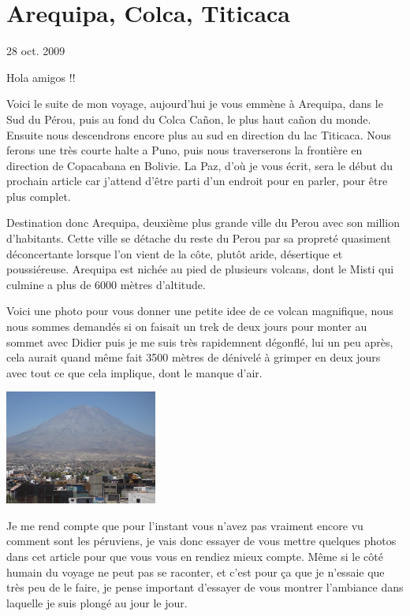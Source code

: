 \section{Arequipa, Colca, Titicaca}

28 oct. 2009

\begin{multicols}{2}

Hola amigos !!

Voici le suite de mon voyage, aujourd'hui je vous emmène à Arequipa, dans le Sud du Pérou, puis au fond du Colca Cañon, le plus haut cañon du monde. Ensuite nous descendrons encore plus au sud en direction du lac Titicaca. Nous ferons une très courte halte a Puno, puis nous traverserons la frontière en direction de Copacabana en Bolivie. La Paz, d'où je vous écrit, sera le début du prochain article car j'attend d'être parti d'un endroit pour en parler, pour être plus complet.

Destination donc Arequipa, deuxième plus grande ville du Perou avec son million d'habitants. Cette ville se détache du reste du Perou par sa propreté quasiment déconcertante lorsque l'on vient de la côte, plutôt aride, désertique et poussiéreuse. Arequipa est nichée au pied de plusieurs volcans, dont le Misti qui culmine a plus de 6000 mètres d'altitude.

Voici une photo pour vous donner une petite idee de ce volcan magnifique, nous nous sommes demandés si on faisait un trek de deux jours pour monter au sommet avec Didier puis je me suis très rapidemnent dégonflé, lui un peu après, cela aurait quand même fait 3500 mètres de dénivelé à grimper en deux jours avec tout ce que cela implique, dont le manque d'air.

\smallbreak
\hspace*{-0.65cm}
\includegraphics[width=5cm]{articles/Arequipa-colca-titicaca/1256606928TSDk.jpg}
\smallbreak

Je me rend compte que pour l'instant vous n'avez pas vraiment encore vu comment sont les péruviens, je vais donc essayer de vous mettre quelques photos dans cet article pour que vous vous en rendiez mieux compte. Même si le côté humain du voyage ne peut pas se raconter, et c'est pour ça que je n'essaie que très peu de le faire, je pense important d'essayer de vous montrer l'ambiance dans laquelle je suis plongé au jour le jour.


\end{multicols}

